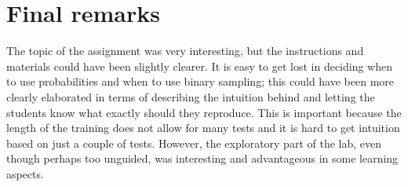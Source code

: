 \documentclass[a4paper]{article}
\begin{document}
\section{Final remarks}
The topic of the assignment was very interesting, but the instructions and materials could have been slightly clearer. It is easy to get lost in deciding when to use probabilities and when to use binary sampling; this could have been more clearly elaborated in terms of describing the intuition behind and letting the students know what exactly should they reproduce. This is important because the length of the training does not allow for many tests and it is hard to get intuition based on just a couple of tests. However, the exploratory part of the lab, even though perhaps too unguided, was interesting and advantageous in some learning aspects.
\end{document}
